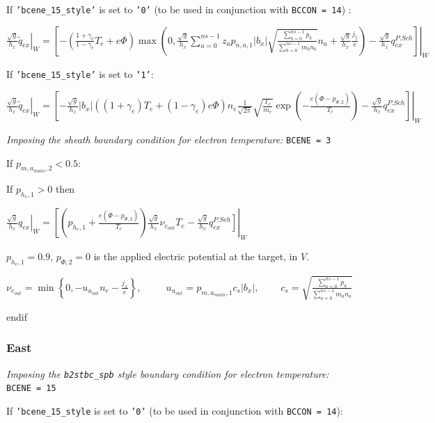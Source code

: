 \documentclass[a4paper,10pt]{report}
\begin{document}
If {\tt 'bcene\_15\_style'} is set to {\tt '0'} (to be used in conjunction with {\tt BCCON = 14}) :
	
$\left. \frac{\sqrt g}{h_x} \widetilde q_{ex} \right|_W = \left. \left[
	-\left(
		\frac{1 + \gamma_e}{1 -\gamma_e} T_e + e\Phi
	\right)
	\max \left(
		0, \frac{\sqrt g}{h_x}
                \sum \limits_{a=0}^{ns-1} z_a p_{n,a,1} |b_x|
		\sqrt{\frac{\sum \limits_{b=0}^{ns-1} p_b}{\sum \limits_{b=0}^{ns-1} m_b n_b}} n_a
		+
		\frac{\sqrt g}{h_x} \frac{j_{\parallel}}e
	\right)
	-
	\frac{\sqrt g}{h_x} q_{ex}^{P.Sch}
\right] \right|_W$

If {\tt 'bcene\_15\_style'} is set to {\tt '1'}:

$\left. \frac{\sqrt g}{h_x} \widetilde q_{ex} \right|_W = \left. \left[
	-\frac{\sqrt g}{h_x} |b_x| \left(
		\left( 1 + \gamma_e \right) T_e +
		\left( 1 - \gamma_e \right) e \Phi
	\right) n_e \frac{1}{\sqrt{2 \pi}}
	\sqrt{\frac{T_e}{m_e}} \exp \left( -\frac{e \left( \Phi - p_{\Phi,2} \right) }{T_e} \right)
	-
	\frac{\sqrt g}{h_x} q_{ex}^{P.Sch}
\right] \right|_W$

{\em Imposing the sheath boundary condition for electron temperature:} {\tt BCENE = 3}

If $p_{m,a_{main},2} < 0.5$:

If $p_{h_e,1} > 0$ then

$\left. \frac{\sqrt g}{h_x} q_{ex} \right|_W = \left[ \left(
	p_{h_e,1} + \frac{ e \left( \Phi - p_{\Phi,2} \right) }{T_e}
\right)
\frac{\sqrt g}{h_x} \nu_{e_{out}} T_e
- \left.
\frac{\sqrt g}{h_x} q_{ex}^{P.Sch}
\right] \right|_W$

$p_{h_e,1} = 0.9$, $p_{\Phi,2} = 0$ is the applied electric potential at the target, in $V$.


$\nu_{e_{out}} = \min \left\{
	0,-u_{u_{out}} n_e - \frac{j_x}e
\right\}
,\;\;\;\;\;\;\;\;\;
u_{u_{out}} = p_{m,a_{main},1} c_s |b_x|
,\;\;\;\;\;\;\;\;
c_s = \sqrt{\frac{\sum \limits_{a=0}^{ns-1} p_a}{\sum \limits_{a=0}^{ns-1} m_a n_a}}$

endif

\subsubsection{East}

{\em Imposing the {\tt b2stbc\_spb} style boundary condition for electron temperature:} {\tt BCENE = 15}

If {\tt 'bcene\_15\_style} is set to {\tt '0'} (to be used in conjunction with {\tt BCCON = 14}):
	
\end{document}
